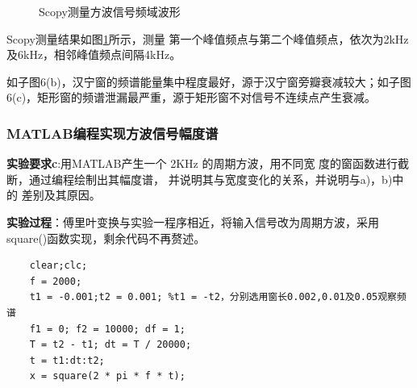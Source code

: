 \documentclass[12pt]{article}
\begin{document}
\begin{figure}[H]
    \centering
    
     \hspace{0.005\linewidth}
         \hspace{0.005\linewidth}
    \caption{Scopy测量方波信号频域波形}
  \label{Scopy_square}
\end{figure}
Scopy测量结果如图\ref{Scopy_square}所示，测量
第一个峰值频点与第二个峰值频点，依次为2kHz及6kHz，相邻峰值频点间隔4kHz。

如子图6(b)，汉宁窗的频谱能量集中程度最好，源于汉宁窗旁瓣衰减较大；如子图6(c)，矩形窗的频谱泄漏最严重，源于矩形窗不对信号不连续点产生衰减。




\subsubsection{MATLAB编程实现方波信号幅度谱}

\textbf{实验要求c}:用MATLAB产生一个 2KHz 的周期方波，用不同宽
度的窗函数进行截断，通过编程绘制出其幅度谱，
并说明其与宽度变化的关系，并说明与a)，b)中的
差别及其原因。

\textbf{实验过程}：傅里叶变换与实验一程序相近，将输入信号改为周期方波，采用square()函数实现，剩余代码不再赘述。
\begin{lstlisting}
    clear;clc;
    f = 2000;
    t1 = -0.001;t2 = 0.001; %t1 = -t2，分别选用窗长0.002,0.01及0.05观察频谱
    f1 = 0; f2 = 10000; df = 1;
    T = t2 - t1; dt = T / 20000;
    t = t1:dt:t2;
    x = square(2 * pi * f * t); 
\end{lstlisting}
\end{document}
